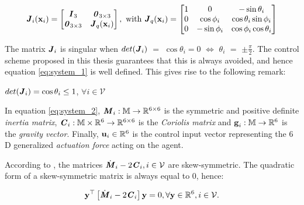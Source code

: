 \begin{equation}
  \bm{\mathit{J}}_i(\bm{\mathbf{x}}_i) =
  \begin{bmatrix}
    \bm{\mathit{I}}_3 & \bm{\mathit{0}}_{3 \times 3} \\
    \bm{\mathit{0}}_{3 \times 3} & \bm{\mathit{J}}_{ q }(\bm{\mathbf{x}}_i) \\
  \end{bmatrix} \notag, \text{ with }
  \bm{\mathit{J}}_q(\bm{\mathbf{x}}_i) =
  \begin{bmatrix}
    1 & 0 & -\sin\theta_i \\
    0 & \cos\phi_i & \cos\theta_i \sin\phi_i \\
    0 & - \sin\phi_i & \cos\phi_i \cos\theta_i
  \end{bmatrix} \notag
\end{equation}

The matrix $\bm{\mathit{J}}_i$ is singular when $det(\bm{\mathit{J}}_i)$ $=$ $\cos\theta_i = 0$
$\Leftrightarrow$ $\theta_i$ $=$ $\pm \frac{\pi}{2}$. The control scheme
proposed in this thesis guarantees that this is always avoided, and hence
equation \eqref{eq:system_1} is well defined. This gives rise to the following
remark:

\begin{bw_box}
  \begin{remark}
    $det(\bm{\mathit{J}}_i) = \cos\theta_i \leq 1$, $\forall i \in \mathcal{V}$
  \end{remark}
\end{bw_box}



In equation \eqref{eq:system_2}, $\bm{\mathit{M}}_i:\mathbb{M} \to \mathbb{R}^{6\times6}$ is
the symmetric and positive definite \textit{inertia matrix},
$\bm{\mathit{C}}_i:\mathbb{M}\times\mathbb{R}^6 \to \mathbb{R}^{6\times6}$ is the
\textit{Coriolis matrix} and $\bm{\mathbf{g}}_i:\mathbb{M} \to \mathbb{R}^6$ is the
\textit{gravity vector}.
Finally, $\bm{\mathbf{u}}_i\in\mathbb{R}^6$ is the control input vector representing
the $6$D generalized \textit{actuation force} acting on the agent.



\begin{bw_box}
  \begin{remark}
    According to \cite{Murray:1994:MIR:561828}, the matrices
    $\dot{\bm{\mathit{M}}}_i - 2\bm{\mathit{C}}_i, i \in \mathcal{V}$ are skew-symmetric.
    The quadratic form of a skew-symmetric matrix is always equal to 0, hence:

    \begin{equation}
      \bm{\mathbf{y}}^\top \left[\dot{\bm{\mathit{M}}}_i - 2 \bm{\mathit{C}}_i\right]\bm{\mathbf{y}} = 0,
        \forall \bm{\mathbf{y}} \in \mathbb{R}^6, i \in \mathcal{V}.
    \label{eq:skew_symm}
    \end{equation}
  \end{remark}
\end{bw_box}

